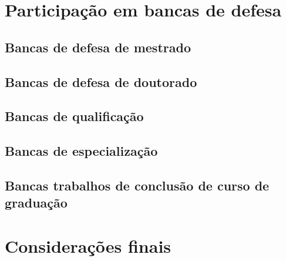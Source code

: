 

\section{Participação em bancas de defesa}

\subsection{Bancas de defesa de mestrado}



\subsection{Bancas de defesa de doutorado}



\subsection{Bancas de qualificação}



\subsection{Bancas de especialização}



\subsection{Bancas trabalhos de conclusão de curso de graduação}



\section{Considerações finais}
